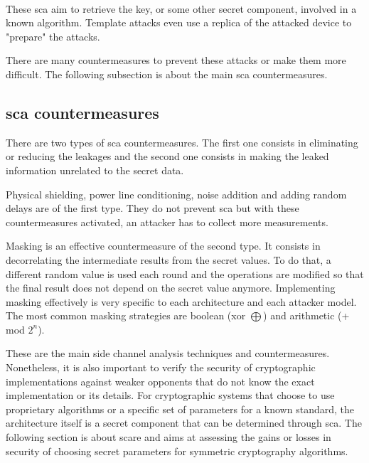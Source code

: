 \documentclass[11pt]{sdm}
\begin{document}
\paragraph{}
These \gls{sca} aim to retrieve the key, or some other secret component, involved in a known algorithm.
Template attacks even use a replica of the attacked device to "prepare" the attacks.

There are many countermeasures to prevent these attacks or make them more difficult.
The following subsection is about the main \acrlong{sca} countermeasures.

\subsection{\acrlong{sca} countermeasures}

There are two types of \gls{sca} countermeasures. 
The first one consists in eliminating or reducing the leakages and the second one consists in making the leaked information unrelated to the secret data.

Physical shielding, power line conditioning, noise addition and adding random delays are of the first type.
They do not prevent \gls{sca} but with these countermeasures activated, an attacker has to collect more measurements.

Masking is an effective countermeasure of the second type.
It consists in decorrelating the intermediate results from the secret values.
To do that, a different random value is used each round and the operations are modified so that the final result does not depend on the secret value anymore.
Implementing masking effectively is very specific to each architecture and each attacker model.
The most common masking strategies are boolean (xor $\bigoplus$) and arithmetic (+ mod $2^n$). %


These are the main side channel analysis techniques and countermeasures. 
Nonetheless, it is also important to verify the security of cryptographic implementations against weaker opponents that do not know the exact implementation or its details.
For cryptographic systems that choose to use proprietary algorithms or a specific set of parameters for a known standard, the architecture itself is a secret component that can be determined through \gls{sca}.
The following section is about \acrlong{scare} and aims at assessing the gains or losses in security of choosing secret parameters for symmetric cryptography algorithms.


\end{document}
